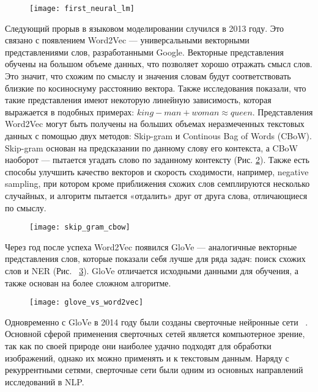 \begin{figure}[ht]
\centering
	\texttt{[image: first\_neural\_lm]}
	\label{fig:first_neural_lm}
\end{figure}

Следующий прорыв в языковом моделировании случился в 2013 году. Это связано с появлением Word2Vec --- универсальными векторными представлениями слов, разработанными Google. Векторные представления обучены на большом объеме данных, что позволяет хорошо отражать смысл слов. Это значит, что схожим по смыслу и значения словам будут соответствовать близкие по косиноснуму расстоянию вектора. Также исследования показали, что такие представления имеют некоторую линейную зависимость, которая выражается в подобных примерах: $king - man + woman \approx queen$.
Представления Word2Vec могут быть получены на больших объемах неразмеченных текстовых данных с помощью двух методов: Skip-gram и Continous Bag of Words (CBoW). Skip-gram основан на предсказании по данному слову его контекста, а CBoW наоборот --- пытается угадать слово по заданному контексту (Рис. \ref{fig:skipgram_cbow}). Также есть способы улучшить качество векторов и скорость сходимости, например, negative sampling, при котором кроме приближения схожих слов семплируются несколько случайных, и алгоритм пытается «отдалить» друг от друга слова, отличающиеся по смыслу.

\begin{figure}[ht]
	\texttt{[image: skip\_gram\_cbow]}
	\label{fig:skipgram_cbow}
\end{figure}

Через год после успеха Word2Vec появился GloVe --- аналогичные векторные представления слов, которые показали себя лучше для ряда задач: поиск схожих слов и NER (Рис. ~\ref{fig:glove_vs_word2vec}). GloVe отличается исходными данными для обучения, а также основан на более сложном алгоритме.~\cite{twds-lm-history}

\begin{figure}[ht]
	\texttt{[image: glove\_vs\_word2vec]}
	\label{fig:glove_vs_word2vec}
\end{figure}

Одновременно с GloVe в 2014 году были созданы сверточные нейронные сети ~\cite{kalchbrenner-etal-2014-convolutional}. Основной сферой применения сверточных сетей является компьютерное зрение, так как по своей природе они наиболее удачно подходят для обработки изображений, однако их можно применять и к текстовым данным. Наряду с рекуррентными сетями, сверточные сети были одним из основных направлений исследований в NLP.

